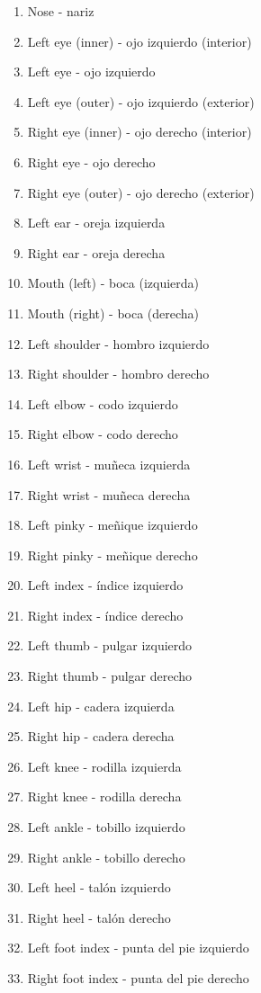 \begin{enumerate}
    \item Nose - nariz  
    \item Left eye (inner) - ojo izquierdo (interior)  
    \item Left eye - ojo izquierdo  
    \item Left eye (outer) - ojo izquierdo (exterior)  
    \item Right eye (inner) - ojo derecho (interior)  
    \item Right eye - ojo derecho  
    \item Right eye (outer) - ojo derecho (exterior)  
    \item Left ear - oreja izquierda  
    \item Right ear - oreja derecha  
    \item Mouth (left) - boca (izquierda)  
    \item Mouth (right) - boca (derecha)  
    \item Left shoulder - hombro izquierdo  
    \item Right shoulder - hombro derecho  
    \item Left elbow - codo izquierdo  
    \item Right elbow - codo derecho  
    \item Left wrist - muñeca izquierda  
    \item Right wrist - muñeca derecha  
    \item Left pinky - meñique izquierdo  
    \item Right pinky - meñique derecho  
    \item Left index - índice izquierdo  
    \item Right index - índice derecho  
    \item Left thumb - pulgar izquierdo  
    \item Right thumb - pulgar derecho  
    \item Left hip - cadera izquierda  
    \item Right hip - cadera derecha  
    \item Left knee - rodilla izquierda  
    \item Right knee - rodilla derecha  
    \item Left ankle - tobillo izquierdo  
    \item Right ankle - tobillo derecho  
    \item Left heel - talón izquierdo  
    \item Right heel - talón derecho  
    \item Left foot index - punta del pie izquierdo  
    \item Right foot index - punta del pie derecho  
\end{enumerate}

